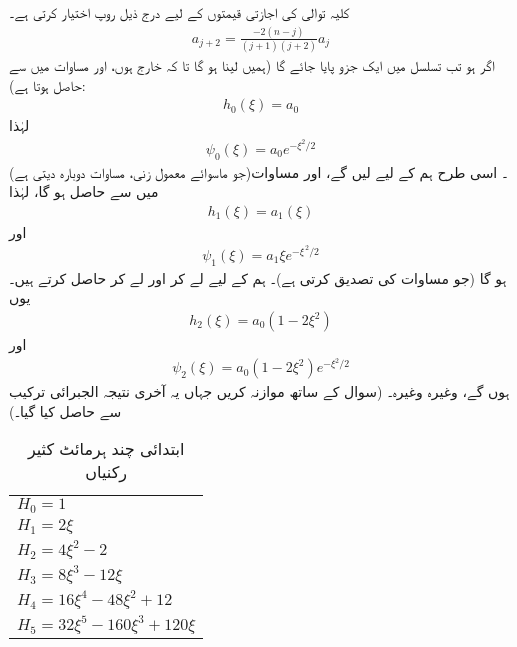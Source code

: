  کلیہ توالی  کی اجازتی قیمتوں کے لیے درج ذیل روپ اختیار کرتی ہے۔
\begin{align}\label{مساوات_شروڈنگر_کلیہ_توالی_اجازتی_الف}
a_{j+2}=\frac{-2(n-j)}{(j+1)(j+2)}a_{j}
\end{align}
اگر  ہو تب تسلسل میں ایک جزو پایا جائے گا (ہمیں  لینا ہو گا تا کہ  خارج ہوں، اور مساوات  میں  سے  حاصل ہوتا ہے):
\begin{align*}
h_{0}(\xi)=a_{0}
\end{align*}
لہٰذا
\begin{align*}
\psi_{0}(\xi)=a_{0}e^{-\xi^{2}/2}
\end{align*}
(جو ماسوائے معمول زنی، مساوات  دوبارہ دیتی ہے)۔ اسی طرح ہم  کے لیے 
 لیں گے، اور مساوات  میں  سے 
حاصل ہو گا، لہٰذا 
\begin{align*}
h_{1}(\xi)=a_{1}(\xi)
\end{align*}
اور
\begin{align*}
\psi_{1}(\xi)=a_{1}\xi e^{-\xi^{\,2}/2}
\end{align*}
ہو گا (جو مساوات  کی تصدیق کرتی ہے)۔ ہم  کے لیے  لے کر
 اور  لے کر  حاصل کرتے ہیں۔ یوں
\begin{align*}
h_{2}(\xi)=a_{0}(1-2\xi^{2})
\end{align*}
اور
\begin{align*}
\psi_{2}(\xi)=a_{0}(1-2\xi^{2})e^{-\xi^{2}/2}
\end{align*}
ہوں گے، وغیرہ وغیرہ۔ (سوال  کے ساتھ موازنہ کریں جہاں یہ آخری نتیجہ الجبرائی ترکیب سے حاصل کیا گیا۔) 
\begin{table}
\caption{ابتدائی چند ہرمائٹ کثیر رکنیاں }
\label{جدول_شروڈنگر_ہرمشی_کثیر_رکنیاں}
\centering
\begin{tabular}{l}
$H_0=1$\\
$H_1=2\xi$\\
$H_2=4\xi^2-2$\\
$H_3=8\xi^3-12\xi$\\
$H_4=16\xi^4-48\xi^2+12$\\
$H_5=32\xi^5-160\xi^3+120\xi$
\end{tabular}
\end{table}
